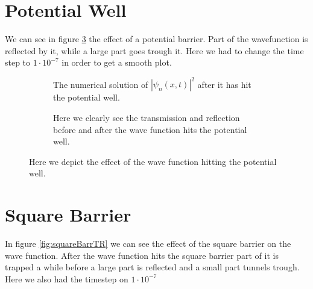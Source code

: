 \documentclass[11pt]{article}
\newlength\figureheight
\newlength\figurewidth
\begin{document}
\section{Potential Well}
We can see in figure \ref{fig:potWell} the effect of a potential barrier. Part of the wavefunction is reflected by it, while a large part goes trough it. Here we had to change the time step to $1\cdot10^{-7}$ in order to get a smooth plot.
\begin{figure}[H]
	\centering
	\begin{subfigure}{.9\linewidth}
		\setlength{}
		\setlength{}
		
		\caption{The numerical solution of $|\psi_n(x,t)|^2$ after it has hit the potential well.}
		\label{fig:potWellfPlot}
	\end{subfigure}
	\begin{subfigure}{.9\linewidth}
		\setlength{}
		\setlength{}
		
		\caption{Here we clearly see the transmission and reflection before and after the wave function hits the potential well.}
		\label{fig:potWellTR}
	\end{subfigure}
	\label{fig:potWell}
	\caption{Here we depict the effect of the wave function hitting the potential well.}
\end{figure}

\newpage
\section{Square Barrier}
In figure \ref{fig:squareBarrTR} we can see the effect of the square barrier on the wave function. After the wave function hits the square barrier part of it is trapped a while before a large part is reflected and a small part tunnels trough. Here we also had the timestep on $1\cdot10^{-7}$
\end{document}
